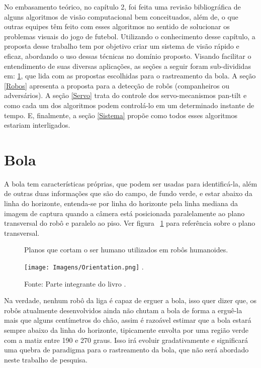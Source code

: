 No embasamento teórico, no capítulo 2, foi feita uma revisão bibliográfica de alguns algoritmos de visão computacional bem conceituados, além de, o que outras equipes têm feito com esses algoritmos no sentido de solucionar os problemas visuais do jogo de futebol. Utilizando o conhecimento desse capítulo, a proposta desse trabalho tem por objetivo criar um sistema de visão rápido e eficaz, abordando o uso dessas técnicas no domínio proposto. Visando facilitar o entendimento de suas diversas aplicações, as seções a seguir foram sub-divididas em: \ref{Bola}, que lida com as propostas escolhidas para o rastreamento da bola. A seção \ref{Robos} apresenta a proposta para a detecção de robôs (companheiros ou adversários). A seção \ref{Servo} trata do controle dos servo-mecanismos pan-tilt e como cada um dos algoritmos podem controlá-lo em um determinado instante de tempo. E, finalmente, a seção \ref{Sistema} propõe como todos esses algoritmos estariam interligados.

\section{Bola}
\label{Bola}

A bola tem características próprias, que podem ser usadas para identificá-la, além de outras duas informações que são do campo, de fundo verde, e estar abaixo da linha do horizonte, entenda-se por linha do horizonte pela linha mediana da imagem de captura quando a câmera está posicionada paralelamente ao plano transversal do robô e paralelo ao piso. Ver figura ~\ref{Fig:Ori} para referência sobre o plano transversal.

\begin{figure}[!h!]
\centering \caption{Planos que cortam o ser humano utilizados em robôs humanoides.}
\texttt{[image: Imagens/Orientation.png]}
\DeclareGraphicsExtensions.
\caption*{Fonte: Parte integrante do livro .}
\label{Fig:Ori}
\end{figure}

Na verdade, nenhum robô da liga é capaz de erguer a bola, isso quer dizer que, os robôs atualmente desenvolvidos ainda não chutam a bola de forma a erguê-la mais que alguns centímetros do chão, assim é razoável estimar que a bola estará sempre abaixo da linha do horizonte, tipicamente envolta por uma região verde com a matiz entre 190 e 270 graus. Isso irá evoluir gradativamente e significará uma quebra de paradigma para o rastreamento da bola, que não será abordado neste trabalho de pesquisa. 

